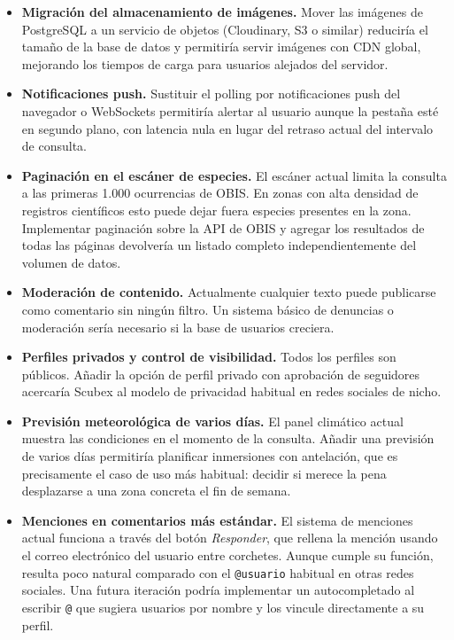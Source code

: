\begin{itemize}

\item \textbf{Migración del almacenamiento de imágenes.} Mover las imágenes de PostgreSQL a un servicio de objetos (Cloudinary, S3 o similar) reduciría el tamaño de la base de datos y permitiría servir imágenes con CDN global, mejorando los tiempos de carga para usuarios alejados del servidor.

\item \textbf{Notificaciones push.} Sustituir el polling por notificaciones push del navegador o WebSockets permitiría alertar al usuario aunque la pestaña esté en segundo plano, con latencia nula en lugar del retraso actual del intervalo de consulta.

\item \textbf{Paginación en el escáner de especies.} El escáner actual limita la consulta a las primeras 1.000 ocurrencias de OBIS. En zonas con alta densidad de registros científicos esto puede dejar fuera especies presentes en la zona. Implementar paginación sobre la API de OBIS y agregar los resultados de todas las páginas devolvería un listado completo independientemente del volumen de datos.

\item \textbf{Moderación de contenido.} Actualmente cualquier texto puede publicarse como comentario sin ningún filtro. Un sistema básico de denuncias o moderación sería necesario si la base de usuarios creciera.

\item \textbf{Perfiles privados y control de visibilidad.} Todos los perfiles son públicos. Añadir la opción de perfil privado con aprobación de seguidores acercaría Scubex al modelo de privacidad habitual en redes sociales de nicho.

\item \textbf{Previsión meteorológica de varios días.} El panel climático actual muestra las condiciones en el momento de la consulta. Añadir una previsión de varios días permitiría planificar inmersiones con antelación, que es precisamente el caso de uso más habitual: decidir si merece la pena desplazarse a una zona concreta el fin de semana.

\item \textbf{Menciones en comentarios más estándar.} El sistema de menciones actual funciona a través del botón \textit{Responder}, que rellena la mención usando el correo electrónico del usuario entre corchetes. Aunque cumple su función, resulta poco natural comparado con el \texttt{@usuario} habitual en otras redes sociales. Una futura iteración podría implementar un autocompletado al escribir \texttt{@} que sugiera usuarios por nombre y los vincule directamente a su perfil.

\end{itemize}

